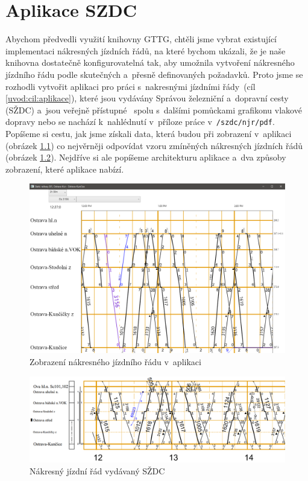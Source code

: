 \chapter{Aplikace SZDC}
\label{kap6:szdc_app}
Abychom předvedli využití knihovny GTTG, chtěli jsme vybrat existující implementaci nákresných jízdních řádů, na které bychom ukázali, že je naše knihovna dostatečně konfigurovatelná tak, aby umožnila vytvoření nákresného jízdního řádu podle skutečných a~přesně definovaných požadavků. Proto jsme se rozhodli vytvořit aplikaci pro práci s~nakresnými jízdními řády~(cíl \ref{uvod:cil:aplikace}), které jsou vydávány Správou železniční a~dopravní cesty (SŽDC) a~jsou veřejně přístupné~\cite{GVD_njr} spolu s~dalšími pomůckami grafikonu vlakové dopravy nebo se nachází k~nahlédnutí v~příloze práce v~\texttt{/szdc/njr/pdf}. Popíšeme si cestu, jak jsme získali data, která budou při zobrazení v~aplikaci (obrázek \ref{fig:kap6:aplikace_vysledek}) co nejvěrněji odpovídat vzoru zmíněných nákresných jízdních řádů (obrázek \ref{fig:kap6:vzor_gvd}). Nejdříve si ale popíšeme architekturu aplikace a~dva způsoby zobrazení, které aplikace nabízí.

\begin{figure}[!hbt]
	\centering
	\includegraphics[width=\textwidth]{../img/kap6_szdc_application}
	\caption{Zobrazení nákresného jízdního řádu v~aplikaci}
	\label{fig:kap6:aplikace_vysledek}
\end{figure}

\begin{figure}[!hbt]
	\centering
	\includegraphics[width=\textwidth]{../img/kap6_njr_vzor}
	\caption{Nákresný jízdní řád vydávaný SŽDC}
	\label{fig:kap6:vzor_gvd}
\end{figure}

